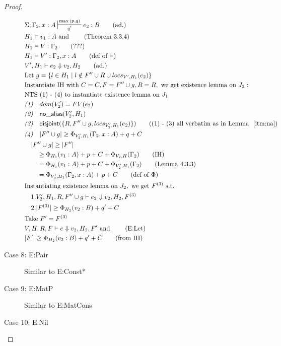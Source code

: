 \documentclass[sigconf]{acmart}
\newcommand{\na}[1]{\mathsf{no\_alias}(#1)}
\newcommand{\dist}[1]{\mathsf{disjoint}(#1)}
\theoremstyle{definition}
\begin{document}
\begin{proof}
\begin{description}
\begin{align*}
  &\Sigma; \Gamma_2, x : A \sststile{q'}{\max{(p,q)}} e_2 : B \tag{ad.}\\
  &H_1 \vDash v_1 : A \text{ and } \tag{Theorem 3.3.4}\\ 
  &H_1 \vDash V : \Gamma_2 \tag{???}\\
  &H_1 \vDash V' : \Gamma_2, x : A \tag{def of $\vDash$}\\
  &V',H_1 \vdash e_2 \Downarrow v_2,H_2 \tag{ad.}\\
  &\text{Let } g = \{l \in H_1 \mid l \notin F'' \cup R \cup locs_{V',H_1}(e_2)\}\\ 
  &\text{Instantiate IH with } C = C, F = F'' \cup g, R = R, \text{ we get existence lemma on  } J_2:\\
  &\text{NTS (1) - (4) to instantiate existence lemma on } J_1\\
  &\emph{(1)} \quad dom(V_2') = FV(e_2)\\
  &\emph{(2)} \quad \na{V_2',H_1} \\
  &\emph{(3)} \quad \dist{\{R,F'' \cup g,locs_{V_2',H_1}(e_2)\}} \tag{(1) - (3) all verbatim as in Lemma $~\ref{itm:na}$}\\
  &\emph{(4)} \quad |F'' \cup g| \ge \Phi_{V_2',H_1}(\Gamma_2,x:A) + q + C\\
  &\quad |F'' \cup g | \ge |F''|\\
  &\quad \quad \ge \Phi_{H_1}(v_1:A) + p + C + \Phi_{V_2,H}(\Gamma_2) \tag{IH}\\ 
  &\quad \quad = \Phi_{H_1}(v_1:A) + p + C + \Phi_{V_2',H_1}(\Gamma_2) \tag{Lemma 4.3.3}\\ 
  &\quad \quad = \Phi_{V_2',H_1}(\Gamma_2,x:A) + p + C \tag{def of $\Phi$}\\
  &\text{Instantiating existence lemma on } J_2, \text{ we get } F^{(3)} \text{ s.t. }\\
  &\quad 1. V_2',H_1,R, F'' \cup g \vdash e_2 \Downarrow v_2,H_2,F^{(3)} \\
  &\quad 2. |F^{(3)}| \ge \Phi_{H_2}(v_2:B) + q' + C\\
  &\text{Take } F' = F^{(3)}\\
  &V,H,R,F \vdash e \Downarrow v_2, H_2,F' \text{ and } \tag{E:Let}\\ 
  &|F'| \ge \Phi_{H_2}(v_2:B) + q' + C \tag{from IH}\\
  \end{align*}
  \item[Case 8: E:Pair]
  Similar to E:Const*
  \item[Case 9: E:MatP]
  Similar to E:MatCons
  \item[Case 10: E:Nil]

\end{description}
\end{proof}
\end{document}
